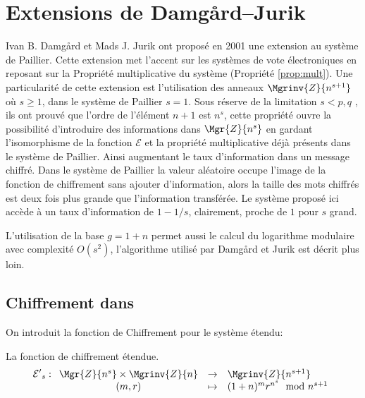 \chapter{Extensions de Damgård–Jurik}
	\label{chap:jurik}

	Ivan B. Damgård et Mads J. Jurik ont proposé en 2001 une extension\cite{Damgard:2001:GSA:648118.746742} au système de 
	Paillier. Cette extension met l'accent sur les systèmes de vote électroniques
	en reposant sur la Propriété multiplicative du système (Propriété \ref{prop:mult}). Une particularité de cette 
	extension est l'utilisation des anneaux $\Mgrinv{Z}{n^{s+1}}$ 
	où $s\geq 1$, dans le système de Paillier $s=1$. Sous réserve de la limitation $s<p,q$ ,
	ils ont prouvé que l'ordre de l'élé\-ment $n+1$ est $n^s$, cette propriété ouvre la possibilité d'introduire des informations
	dans $\Mgr{Z}{n^{s}}$ en gardant l'isomorphisme de la fonction $\mathcal{E}$ et la propriété multiplicative 
	déjà présents dans le système de Paillier. Ainsi 
	augmentant le taux d'information dans un message chiffré. Dans le système de Paillier la valeur aléatoire occupe l'image de la fonction
	de chiffrement sans ajouter d'information, alors la taille des mots chiffrés est deux fois plus grande que l'information 
	transférée. Le système proposé ici accède à un taux d'information de $1 -1/s$, clairement, proche de $1$ pour $s$ grand.

	L'utilisation de la base $g=1+n$ permet aussi le calcul du logarithme modulaire avec complexité $O(s^2)$, 
	l'algorithme utilisé par Damgård et Jurik est décrit plus loin.

	\section{Chiffrement dans }

	On introduit la fonction de Chiffrement pour le système étendu:

	\begin{definition} La fonction de chiffrement étendue.
		\begin{equation}
			\mathcal{E'}_{s} : \begin{array}[t]{ccl} \Mgr{Z}{n^s} \times \Mgrinv{Z}{n} &\rightarrow & \Mgrinv{Z}{n^{s+1}}  \\
			(m,r)&\mapsto& (1+n)^mr^{n^s}\mod{n^{s+1}}	 \end{array}
		\end{equation}
	\end{definition}

